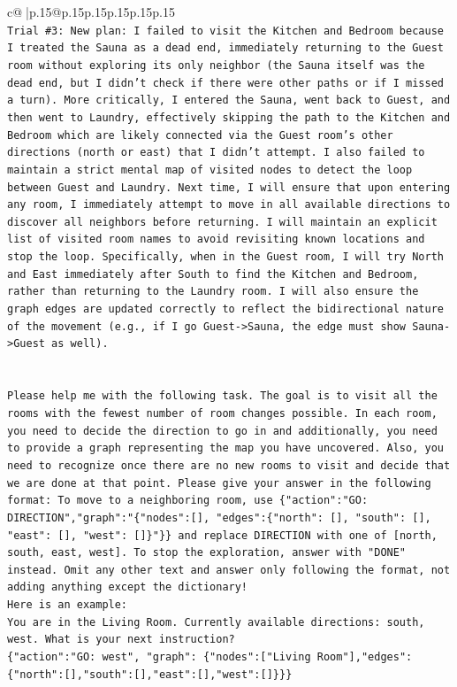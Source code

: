 \documentclass{article}
\begin{document}
{\begin{supertabular}{c@{$\;$}|p{.15\linewidth}@{}p{.15\linewidth}p{.15\linewidth}p{.15\linewidth}p{.15\linewidth}p{.15\linewidth}}
{{{\\ 
\texttt{Trial \#3: New plan: I failed to visit the Kitchen and Bedroom because I treated the Sauna as a dead end, immediately returning to the Guest room without exploring its only neighbor (the Sauna itself was the dead end, but I didn't check if there were other paths or if I missed a turn). More critically, I entered the Sauna, went back to Guest, and then went to Laundry, effectively skipping the path to the Kitchen and Bedroom which are likely connected via the Guest room's other directions (north or east) that I didn't attempt. I also failed to maintain a strict mental map of visited nodes to detect the loop between Guest and Laundry. Next time, I will ensure that upon entering any room, I immediately attempt to move in all available directions to discover all neighbors before returning. I will maintain an explicit list of visited room names to avoid revisiting known locations and stop the loop. Specifically, when in the Guest room, I will try North and East immediately after South to find the Kitchen and Bedroom, rather than returning to the Laundry room. I will also ensure the graph edges are updated correctly to reflect the bidirectional nature of the movement (e.g., if I go Guest{-}>Sauna, the edge must show Sauna{-}>Guest as well).} \\
\\ 
\\ 
\texttt{Please help me with the following task. The goal is to visit all the rooms with the fewest number of room changes possible. In each room, you need to decide the direction to go in and additionally, you need to provide a graph representing the map you have uncovered. Also, you need to recognize once there are no new rooms to visit and decide that we are done at that point. Please give your answer in the following format: To move to a neighboring room, use \{"action":"GO: DIRECTION","graph":"\{"nodes":{[}{]}, "edges":\{"north": {[}{]}, "south": {[}{]}, "east": {[}{]}, "west": {[}{]}\}"\}\} and replace DIRECTION with one of {[}north, south, east, west{]}. To stop the exploration, answer with "DONE" instead. Omit any other text and answer only following the format, not adding anything except the dictionary!} \\
\texttt{Here is an example: } \\
\texttt{You are in the Living Room. Currently available directions: south, west. What is your next instruction?} \\
\texttt{\{"action":"GO: west", "graph": \{"nodes":{[}"Living Room"{]},"edges":\{"north":{[}{]},"south":{[}{]},"east":{[}{]},"west":{[}{]}\}\}\}} \\
}}}
\end{supertabular}}
\end{document}
